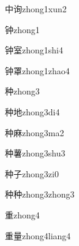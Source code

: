 \begin{verbete}[4;8]{中询}{zhong1xun2}
\end{verbete}

\begin{verbete}[9]{钟}{zhong1}
\end{verbete}

\begin{verbete}[9;9]{钟室}{zhong1shi4}
\end{verbete}

\begin{verbete}[9;13]{钟罩}{zhong1zhao4}
\end{verbete}

\begin{verbete}[9]{种}{zhong3}
\end{verbete}

\begin{verbete}[9;3]{种地}{zhong3di4}
\end{verbete}

\begin{verbete}[9;11]{种麻}{zhong3ma2}
\end{verbete}

\begin{verbete}[9;16]{种薯}{zhong3shu3}
\end{verbete}

\begin{verbete}[9;3]{种子}{zhong3zi0}
\end{verbete}

\begin{verbete}[9;9]{种种}{zhong3zhong3}
\end{verbete}

\begin{verbete}[9]{重}{zhong4}
\end{verbete}

\begin{verbete}[8;12]{重量}{zhong4liang4}
\end{verbete}

